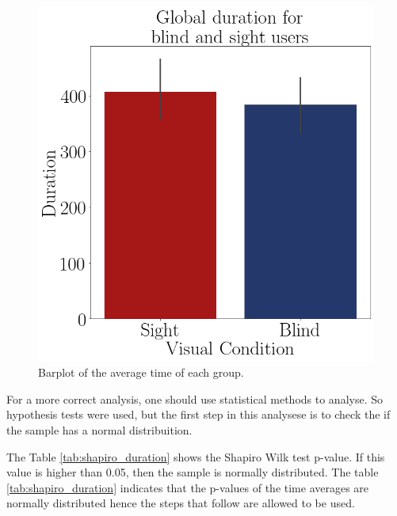 \begin{figure}[!htb]
\begin{minipage}{.45\linewidth}
    \end{minipage}
    \begin{minipage}{.1\linewidth}
        \hfill
    \end{minipage}
    \begin{minipage}{.45\linewidth}
        \centering
        \vspace{1.8cm}
        \includegraphics[width = \linewidth]{Resultados/Tempo/Figuras/png/barplot_duration_global.png}
        \caption{Barplot of the average time of each group.}
        \label{fig:barplot_duration_global}
    \end{minipage}
\end{figure}

For a more correct analysis, one should use statistical methods to analyse. So hypothesis tests were used, but the first step in this analysese is to check the if the sample has a normal distribuition. 

The Table \ref{tab:shapiro_duration} shows the Shapiro Wilk test p-value. If this value is higher than 0.05, then the sample is normally distributed. The table \ref{tab:shapiro_duration} indicates that the p-values of the time averages are normally distributed hence the steps that follow are allowed to be used.

